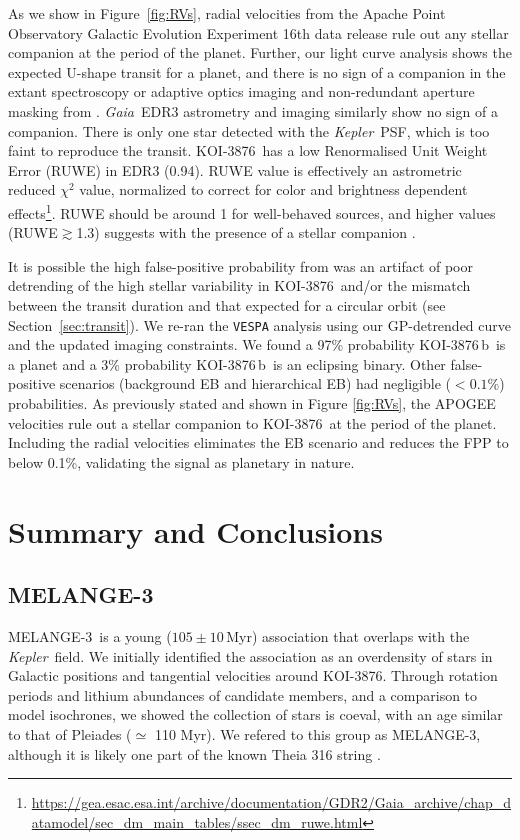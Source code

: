 \documentclass[twocolumn, linenumbers]{aastex631}
\newcommand{\association}{MELANGE-3}
\newcommand{\starname}{KOI-3876}
\newcommand{\planetname}{KOI-3876\,b}
\newcommand{\kepler}{{\it Kepler}}
\newcommand{\gaia}{\textit{Gaia}}
\begin{document}
 As we show in Figure~\ref{fig:RVs}, radial velocities from the Apache Point Observatory Galactic Evolution Experiment 16th data release \citep[APOGEE DR16;][]{2020AJ....160..120J} rule out any stellar companion at the period of the planet. Further, our light curve analysis shows the expected U-shape transit for a planet, and there is no sign of a companion in the extant spectroscopy or adaptive optics imaging and non-redundant aperture masking from \citet{Kraus2016a}. \gaia\ EDR3 astrometry and imaging similarly show no sign of a companion. There is only one star detected with the \kepler\ PSF, which is too faint to reproduce the transit. \starname\ has a low Renormalised Unit Weight Error (RUWE) in EDR3 (0.94). RUWE value is effectively an astrometric reduced $\chi^2$ value, normalized to correct for color and brightness dependent effects\footnote{\url{https://gea.esac.esa.int/archive/documentation/GDR2/Gaia_archive/chap_datamodel/sec_dm_main_tables/ssec_dm_ruwe.html}}. RUWE should be around 1 for well-behaved sources, and higher values (RUWE$\gtrsim$1.3) suggests with the presence of a stellar companion \citep{Ziegler2020, Wood2021}. 
 
 It is possible the high false-positive probability from \citet{2016ApJ...822...86M} was an artifact of poor detrending of the high stellar variability in \starname\ and/or the mismatch between the transit duration and that expected for a circular orbit (see Section~\ref{sec:transit}). We re-ran the \texttt{VESPA} analysis using our GP-detrended curve and the updated imaging constraints. We found a 97\% probability \planetname\ is a planet and a 3\% probability \planetname\ is an eclipsing binary. Other false-positive scenarios (background EB and hierarchical EB) had negligible ($<0.1$\%) probabilities. As previously stated and shown in Figure \ref{fig:RVs}, the APOGEE velocities rule out a stellar companion to \starname\ at the period of the planet. Including the radial velocities eliminates the EB scenario and reduces the FPP to below 0.1\%, validating the signal as planetary in nature. 


\section{Summary and Conclusions}\label{sec:summary}

\subsection{\association}
\association\ is a young ($105\pm10$\,Myr) association that overlaps with the \kepler\ field. We initially identified the association as an overdensity of stars in Galactic positions and tangential velocities around \starname. Through rotation periods and lithium abundances of candidate members, and a comparison to model isochrones, we showed the collection of stars is coeval, with an age similar to that of Pleiades ($\simeq$ 110 Myr). We refered to this group as \association, although it is likely one part of the known Theia 316 string \citep{2019AJ....158..122K, 2020AJ....160..279K}. 
\end{document}
